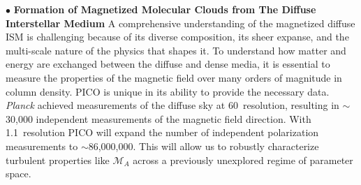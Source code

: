 \documentclass[PICOReport.tex]{subfiles}
\begin{document}


\noindent$\bullet$ {\bf Formation of Magnetized Molecular Clouds from The Diffuse Interstellar Medium} \hspace{0.1in}
A comprehensive understanding of the magnetized diffuse \ac{ISM} is challenging because of its diverse composition, its sheer expanse, and the multi-scale nature of the physics that shapes it. To understand how matter and energy are exchanged between the diffuse and dense media, it is essential to measure the properties of the magnetic field over many orders of magnitude in column density. PICO is unique in its ability to provide the necessary data. \textit{Planck} achieved measurements of the diffuse sky at 60\arcmin\ resolution, resulting in $\sim$30,000 independent measurements of the magnetic field direction.  With 1.1\arcmin~resolution PICO will expand the number of independent polarization measurements to $\sim$86,000,000. This will allow us to robustly characterize turbulent properties like $\mathcal{M}_A$ across a previously unexplored regime of parameter space. 
\end{document}
